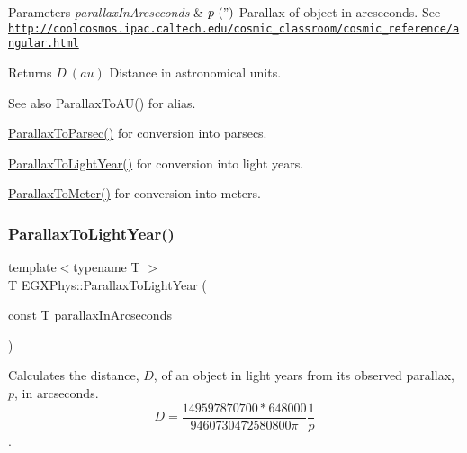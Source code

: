 \begin{DoxyParams}{Parameters}
{\em parallax\+In\+Arcseconds} & $ p\ (")$ Parallax of object in arcseconds. See \href{http://coolcosmos.ipac.caltech.edu/cosmic_classroom/cosmic_reference/angular.html}{\tt http\+://coolcosmos.\+ipac.\+caltech.\+edu/cosmic\+\_\+classroom/cosmic\+\_\+reference/angular.\+html} \\
\hline
\end{DoxyParams}
\begin{DoxyReturn}{Returns}
$ D\ (au)$ Distance in astronomical units. 
\end{DoxyReturn}
\begin{DoxySeeAlso}{See also}
Parallax\+To\+A\+U() for alias. 

\mbox{\hyperlink{group___e_g_x_phys-_astrophysic-_parallax_gab42dbec142e1a47925fc45e899845861}{Parallax\+To\+Parsec()}} for conversion into parsecs. 

\mbox{\hyperlink{group___e_g_x_phys-_astrophysic-_parallax_gacaec31498f264e2a1dc285062a394de2}{Parallax\+To\+Light\+Year()}} for conversion into light years. 

\mbox{\hyperlink{group___e_g_x_phys-_astrophysic-_parallax_ga94912bf8b98a04cccab8ef19eaa89b6a}{Parallax\+To\+Meter()}} for conversion into meters. 
\end{DoxySeeAlso}
\mbox{\label{group___e_g_x_phys-_astrophysic-_parallax_gacaec31498f264e2a1dc285062a394de2}} 
\subsubsection{\texorpdfstring{Parallax\+To\+Light\+Year()}{ParallaxToLightYear()}}
{\footnotesize\ttfamily template$<$typename T $>$ \\
T E\+G\+X\+Phys\+::\+Parallax\+To\+Light\+Year (\begin{DoxyParamCaption}\item[{const T}]{parallax\+In\+Arcseconds }\end{DoxyParamCaption})}



Calculates the distance, $D$, of an object in light years from its observed parallax, $p$, in arcseconds. \[ D=\dfrac{149597870700 * 648000}{9460730472580800 \pi} \dfrac{1}{p}\]. 


